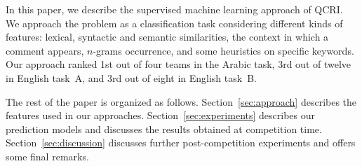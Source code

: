 In this paper, we describe the supervised machine learning approach of QCRI\@. 
We approach the problem as a classification task considering different kinds 
of features: lexical, syntactic and semantic similarities, the context in which 
a comment appears, $n$-grams occurrence, and some heuristics on specific 
keywords. Our approach ranked 1st out of four teams in the Arabic task, 3rd out 
of twelve in English task~A, and 3rd out of eight in English task~B. 

The rest of the paper is organized as follows. Section~\ref{sec:approach} 
describes the features used in our approaches. Section~\ref{sec:experiments} 
describes our prediction models and discusses the results obtained at 
competition time. Section~\ref{sec:discussion} discusses further 
post-competition experiments and offers some final remarks.